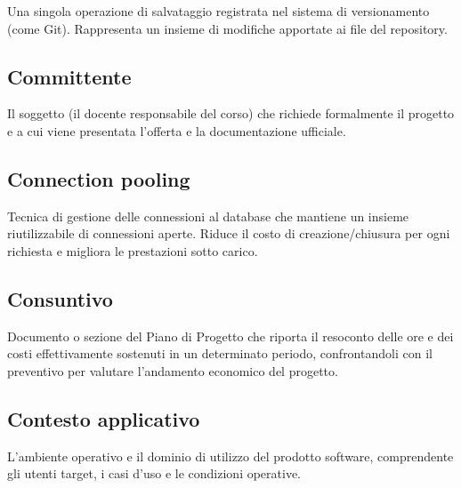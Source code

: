\documentclass[a4paper, 11pt, oneside]{scrartcl} %
\begin{document}

Una singola operazione di salvataggio registrata nel sistema di versionamento (come Git). Rappresenta un insieme di modifiche apportate ai file del repository.

\vspace{0.5cm}

\subsection*{Committente}


Il soggetto (il docente responsabile del corso) che richiede formalmente il progetto e a cui viene presentata l'offerta e la documentazione ufficiale.

\vspace{0.5cm}

\subsection*{Connection pooling}
Tecnica di gestione delle connessioni al database che mantiene un insieme riutilizzabile di connessioni aperte. Riduce il costo di creazione/chiusura per ogni richiesta e migliora le prestazioni sotto carico.
\vspace{0.5cm}

\subsection*{Consuntivo}
Documento o sezione del Piano di Progetto che riporta il resoconto delle ore e dei costi effettivamente sostenuti in un determinato periodo, confrontandoli con il preventivo per valutare l'andamento economico del progetto.
\vspace{0.5cm}

\subsection*{Contesto applicativo}


L'ambiente operativo e il dominio di utilizzo del prodotto software, comprendente gli utenti target, i casi d'uso e le condizioni operative.
\end{document}
